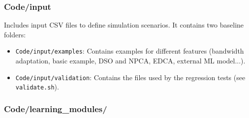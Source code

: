 \documentclass[11pt,a4paper]{article}
\begin{document}
\subsubsection{Code/input}

Includes input CSV files to define simulation scenarios. It contains two baseline folders:
\begin{itemize}
    \item \texttt{Code/input/examples}: Contains examples for different features (bandwidth adaptation, basic example, DSO and NPCA, EDCA, external ML model...).
    \item \texttt{Code/input/validation}: Contains the files used by the regression tests (see \texttt{validate.sh}).
\end{itemize}

\subsubsection{Code/learning\_modules/}
\end{document}
